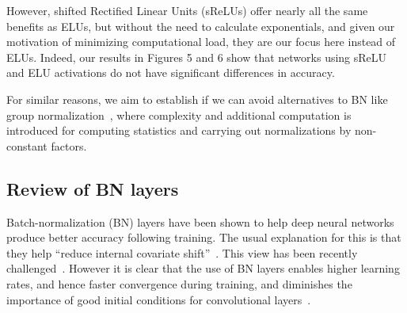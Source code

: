 \documentclass[conference]{IEEEtran}
\begin{document}
However, shifted Rectified Linear Units (sReLUs) offer nearly all the same benefits as ELUs, but without the need to calculate exponentials, and given our motivation of minimizing computational load, they are our focus here instead of ELUs. Indeed, our results in Figures 5 and 6 show that networks using sReLU and ELU activations do not have significant differences in accuracy. 

For similar reasons, we aim to establish if we can avoid alternatives to BN like group normalization~\cite{Wu.18}, where  complexity and additional computation is introduced for computing statistics and carrying out normalizations by non-constant factors.

 
\subsection{Review of BN layers} 

Batch-normalization (BN) layers have been shown to help deep neural networks produce better accuracy following training. The usual explanation for this is that they help ``reduce internal covariate shift''~\cite{Ioffe.15}. This view has been recently challenged~\cite{Santurkar.18}. However it is clear that the use of BN layers enables higher learning rates, and hence faster convergence during training, and diminishes the importance of good initial conditions for convolutional layers~\cite{Ioffe.15,Ioffe.17}. 
\end{document}
